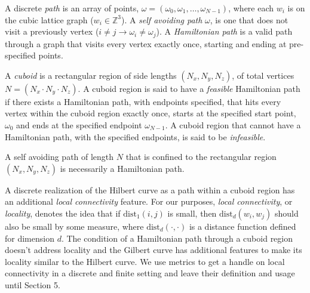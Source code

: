 A discrete \textit{path} is an array of points, $\omega = (\omega_0, \omega_1, \dots, \omega_{N-1})$, where each $w_i$ is on the
cubic lattice graph ($w_i \in \mathbb{Z}^3$).
A \textit{self avoiding path} $\omega$, is one that does not visit a previously vertex ($i \ne j \to \omega_i \ne \omega_j$).
A \textit{Hamiltonian path} is a valid path through a graph that visits every vertex exactly once, starting
and ending at pre-specified points.

A \textit{cuboid} is a rectangular region of side lengths $( N _ x, N _ y, N _ z)$,  of total vertices $N = (N _ x \cdot N _ y \cdot N _ z)$.
A cuboid region is said to have a \textit{feasible} Hamiltonian path if there exists a Hamiltonian path, with endpoints specified,
that hits every vertex within the cuboid region exactly once, starts at the specified start
point, $\omega_0$ and ends at the specified endpoint $\omega_{N-1}$.
A cuboid region that cannot have a Hamiltonian path, with the specified endpoints, is said to be \textit{infeasible}.

A self avoiding path of length $N$ that is confined to the rectangular region $(N_x, N_y, N_z)$ is necessarily a Hamiltonian path.

A discrete realization of the Hilbert curve as a path within a cuboid region has an additional \textit{local connectivity} feature.
For our purposes, \textit{local connectivity}, or \textit{locality}, denotes the idea that if $\text{dist}_1(i,j)$ is small, then $\text{dist}_d(w_i,w_j)$
should also be small by some measure, where $\text{dist}_d(\cdot,\cdot)$ is a distance function defined for dimension $d$.
The condition of a Hamiltonian path through a cuboid region doesn't address locality and the Gilbert curve
has additional features to make its locality similar to the Hilbert curve.
We use metrics to get a handle on local connectivity in a discrete and finite setting and leave
their definition and usage until Section 5.



